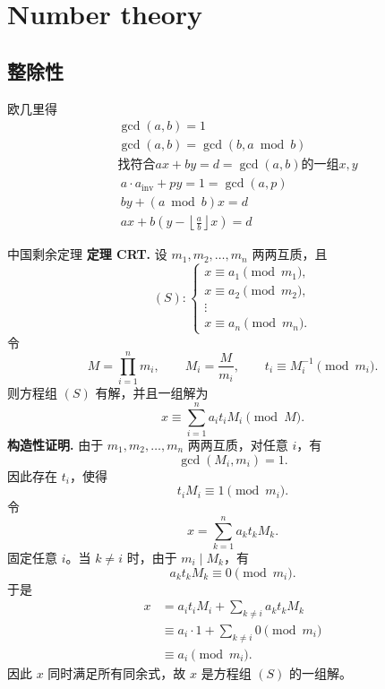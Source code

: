 \chapter{Number theory}

\section{整除性}

	\begin{lecture}{欧几里得}
		\[
		\begin{aligned}
			&\gcd(a, b) = 1\\
			&\gcd(a, b) = \gcd(b, a \bmod b)\\
			&\text{找符合} ax + by = d = \gcd(a, b) \text{的一组} x, y\\
			&\ a \cdot a_{\mathrm{inv}} + py = 1 = \gcd(a, p)\\
			&\ by + (a \bmod b)x = d\\
			&\ ax + b(y - \left\lfloor \frac{a}{b} \right\rfloor x) = d
		\end{aligned}
		\]
	\end{lecture}
	\begin{lecture}{中国剩余定理}
		\textbf{定理 CRT.} 设 $m_1,m_2,\ldots,m_n$ 两两互质，且
		\[
		(S):
		\left\{
		\begin{matrix}
			x \equiv a_1 \pmod{m_1},\\
			x \equiv a_2 \pmod{m_2},\\
			\vdots\\
			x \equiv a_n \pmod{m_n}.
		\end{matrix}
		\right.
		\]
		令
		\[
			M=\prod_{i=1}^{n}m_i,\qquad
			M_i=\frac{M}{m_i},\qquad
			t_i\equiv M_i^{-1}\pmod{m_i}.
		\]
		则方程组 $(S)$ 有解，并且一组解为
		\[
			x\equiv \sum_{i=1}^{n} a_i t_i M_i \pmod M.
		\]
		\textbf{构造性证明.} 由于 $m_1,m_2,\ldots,m_n$ 两两互质，对任意 $i$，有
		\[
			\gcd(M_i,m_i)=1.
		\]
		因此存在 $t_i$，使得
		\[
			t_iM_i\equiv 1\pmod{m_i}.
		\]
		令
		\[
			x=\sum_{k=1}^{n}a_k t_k M_k.
		\]
		固定任意 $i$。当 $k\ne i$ 时，由于 $m_i\mid M_k$，有
		\[
			a_k t_k M_k\equiv 0\pmod{m_i}.
		\]
		于是
		\[
		\begin{aligned}
			x
			&=a_i t_i M_i+\sum_{k\ne i}a_k t_k M_k\\
			&\equiv a_i\cdot 1+\sum_{k\ne i}0 \pmod{m_i}\\
			&\equiv a_i \pmod{m_i}.
		\end{aligned}
		\]
		因此 $x$ 同时满足所有同余式，故 $x$ 是方程组 $(S)$ 的一组解。
		
	\end{lecture}

